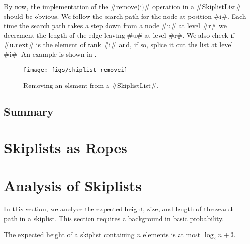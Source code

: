 By now, the implementation of 
the #remove(i)# operation in a #SkiplistList# should be obvious.  We follow the search path for the node at position #i#.  Each time the search path takes a step down from a node #u# at level #r# we decrement the length of the edge leaving #u# at level #r#.  We also check if #u.next# is the element of rank #i# and, if so, splice it out the list at level #i#.   An example is shown in .
\begin{figure}
  \begin{center}
    \texttt{[image: figs/skiplist-removei]}
  \end{center}
  \caption{Removing an element from a #SkiplistList#.}
\end{figure}

\subsection{Summary}


\section{Skiplists as Ropes}

\section{Analysis of Skiplists}

In this section, we analyze the expected height, size, and length of
the search path in a skiplist.  This section requires a background in
basic probability.

\begin{lem}
  The expected height of a skiplist containing $n$ elements is at most
  $\log_2 n + 3$.
\end{lem}

